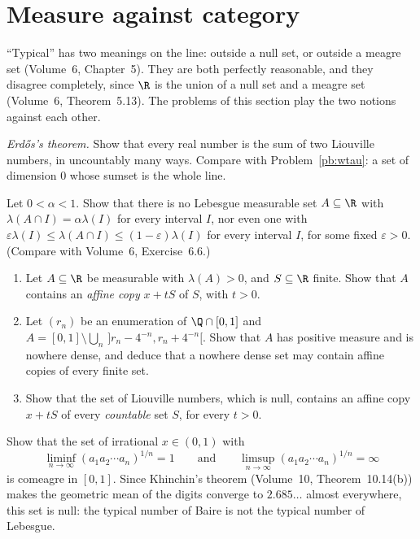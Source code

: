 \section{Measure against category}

``Typical'' has two meanings on the line: outside a null set, or outside a meagre set (Volume~6, Chapter~5). They are both perfectly reasonable, and
they disagree completely, since $\R$ is the union of a null set and a meagre set (Volume~6, Theorem~5.13). The problems of this section play the two
notions against each other.

\begin{exercise}[$\star$]\label{pb:erdosL}
\emph{Erdős's theorem.} Show that every real number is the sum of two Liouville numbers, in uncountably many ways. Compare with
Problem~\ref{pb:wtau}: a set of dimension $0$ whose sumset is the whole line.
\end{exercise}

\begin{exercise}[$\star$]\label{pb:halves}
Let $0<\alpha<1$. Show that there is no Lebesgue measurable set $A\subseteq\R$ with $\lambda(A\cap I)=\alpha\lambda(I)$ for every interval $I$, nor even one
with $\varepsilon\lambda(I)\le\lambda(A\cap I)\le(1-\varepsilon)\lambda(I)$ for every interval $I$, for some fixed $\varepsilon>0$. (Compare with Volume~6,
Exercise~6.6.)
\end{exercise}

\begin{exercise}[$\star\star$]\label{pb:similar}
\begin{enumerate}[label=(\alph*)]
\item Let $A\subseteq\R$ be measurable with $\lambda(A)>0$, and $S\subseteq\R$ finite. Show that $A$ contains an \emph{affine copy} $x+tS$ of $S$, with
$t>0$.
\item Let $(r_n)$ be an enumeration of $\Q\cap[0,1]$ and $A=[0,1]\setminus\bigcup_n\,]r_n-4^{-n},r_n+4^{-n}[$. Show that $A$ has positive measure and is
nowhere dense, and deduce that a nowhere dense set may contain affine copies of every finite set.
\item Show that the set of Liouville numbers, which is null, contains an affine copy $x+tS$ of every \emph{countable} set $S$, for every $t>0$.
\end{enumerate}
\end{exercise}

\begin{exercise}[$\star\star$]\label{pb:typicalcf}
Show that the set of irrational $x\in(0,1)$ with
\[
\liminf_{n\to\infty}(a_1a_2\cdots a_n)^{1/n}=1\qquad\text{and}\qquad\limsup_{n\to\infty}(a_1a_2\cdots a_n)^{1/n}=\infty
\]
is comeagre in $[0,1]$. Since Khinchin's theorem (Volume~10, Theorem~10.14(b)) makes the geometric mean of the digits converge to $2.685\ldots$ almost
everywhere, this set is null: the typical number of Baire is not the typical number of Lebesgue.
\end{exercise}


